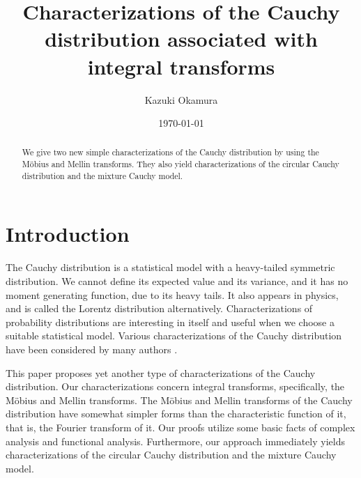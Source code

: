 \documentclass[a4paper, reqno, 11pt]{amsart}
\theoremstyle{definition}
\begin{document}
\title[]{Characterizations of the Cauchy distribution associated with integral transforms}


\author[K. Okamura]{Kazuki Okamura}
\address{School of General Education, Shinshu University}



\date{\today}
\maketitle

\begin{abstract}
We give two new simple characterizations of the Cauchy distribution by using the  M\"obius and Mellin transforms.   
They  also yield characterizations of the circular Cauchy distribution and the mixture Cauchy model. 
\end{abstract}


\section{Introduction} 

The Cauchy distribution is a statistical model with a heavy-tailed symmetric distribution. 
We cannot define its expected value and its variance, and it has no moment generating function, due to its heavy tails. 
It also appears in physics, and is called the Lorentz distribution alternatively. 
Characterizations of probability distributions are interesting in itself and useful when we choose a suitable statistical model. 
Various characterizations of the Cauchy distribution have been considered by many authors \cite{Arnold1979,Arnold1990, Bell1985, Chin2020, Dunau1987, Hamedani1993, Hassenforder1988, Knight1976b, Knight1976a, Letac1977, Menon1962, Menon1966, Norton1983, Obretenov1961, Ramachandran1970, Williams1969, Yanushkevichius2007,Yanushkevichius2014}. 

This paper proposes yet another type of characterizations of the Cauchy distribution. 
Our characterizations concern  integral transforms, specifically, the M\"obius and Mellin transforms.    
The M\"obius and Mellin transforms of the Cauchy distribution have somewhat simpler forms than the characteristic function of it, that is, the Fourier transform of it. 
Our proofs utilize some basic facts of complex analysis and functional analysis. 
Furthermore, our approach immediately yields characterizations of the circular Cauchy distribution and the mixture Cauchy model. 
\end{document}
